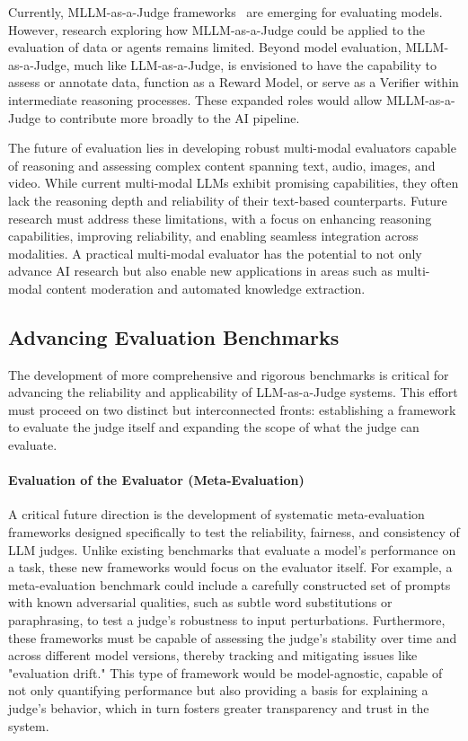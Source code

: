 \documentclass[acmsmall,screen]{acmart}
\begin{document}
Currently, MLLM-as-a-Judge frameworks~\cite{mllm-as-a-judge} are emerging for evaluating models. However, research exploring how MLLM-as-a-Judge could be applied to the evaluation of data or agents remains limited. Beyond model evaluation, MLLM-as-a-Judge, much like LLM-as-a-Judge, is envisioned to have the capability to assess or annotate data, function as a Reward Model, or serve as a Verifier within intermediate reasoning processes. These expanded roles would allow MLLM-as-a-Judge to contribute more broadly to the AI pipeline.

The future of evaluation lies in developing robust multi-modal evaluators capable of reasoning and assessing complex content spanning text, audio, images, and video. While current multi-modal LLMs exhibit promising capabilities, they often lack the reasoning depth and reliability of their text-based counterparts. Future research must address these limitations, with a focus on enhancing reasoning capabilities, improving reliability, and enabling seamless integration across modalities. A practical multi-modal evaluator has the potential to not only advance AI research but also enable new applications in areas such as multi-modal content moderation and automated knowledge extraction.


\subsection{Advancing Evaluation Benchmarks}\label{subsec:future_benchmarks}

The development of more comprehensive and rigorous benchmarks is critical for advancing the reliability and applicability of LLM-as-a-Judge systems. This effort must proceed on two distinct but interconnected fronts: establishing a framework to evaluate the judge itself and expanding the scope of what the judge can evaluate.

\paragraph{\textbf{Evaluation of the Evaluator (Meta-Evaluation)}}
A critical future direction is the development of systematic meta-evaluation frameworks designed specifically to test the reliability, fairness, and consistency of LLM judges. Unlike existing benchmarks that evaluate a model's performance on a task, these new frameworks would focus on the evaluator itself. For example, a meta-evaluation benchmark could include a carefully constructed set of prompts with known adversarial qualities, such as subtle word substitutions or paraphrasing, to test a judge's robustness to input perturbations. Furthermore, these frameworks must be capable of assessing the judge's stability over time and across different model versions, thereby tracking and mitigating issues like "evaluation drift." This type of framework would be model-agnostic, capable of not only quantifying performance but also providing a basis for explaining a judge's behavior, which in turn fosters greater transparency and trust in the system.
\end{document}
